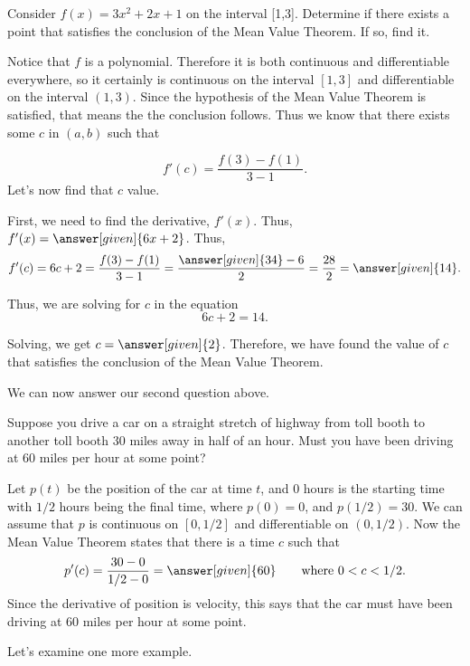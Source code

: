 \documentclass{ximera}
\begin{document}
\begin{example}
    Consider $f(x)=3x^2+2x+1$ on the interval [1,3]. Determine if there exists a point that satisfies the conclusion of the Mean Value Theorem. If so, find it.
    \begin{explanation}
        Notice that $f$ is a polynomial. Therefore it is both continuous and differentiable everywhere, so it certainly is continuous on the interval $[1,3]$ and differentiable on the interval $(1,3)$. Since the hypothesis of the Mean Value Theorem is satisfied, that means the the conclusion follows. Thus we know that there exists some $c$ in $(a,b)$ such that
        
        \[ f'(c)=\frac{f(3)-f(1)}{3-1}.\]
        Let's now find that $c$ value.

    First, we need to find the derivative, $f'(x)$. Thus, $f'(x)=\answer[given]{6x+2}$. Thus,
    \[ f'(c)=6c+2=\frac{f(3)-f(1)}{3-1}=\frac{\answer[given]{34}-6}{2}=\frac{28}{2}=\answer[given]{14}.\]

    Thus, we are solving for $c$ in the equation
    \[6c+2=14.\]

    Solving, we get $c=\answer[given]{2}$. Therefore, we have found the value of $c$ that satisfies the conclusion of the Mean Value Theorem.
    \end{explanation}
\end{example}
We can now answer our second question above.  

\begin{example}
Suppose you drive a car on a straight stretch of highway from toll booth to another toll
booth $30$ miles away in half of an hour. Must you have been driving
at $60$ miles per hour at some point?

\begin{explanation}
Let $p(t)$ be the position of the car at time $t$, and $0$ hours is the
starting time with $1/2$ hours being the final time, where $p(0)=0$, and $p(1/2)=30$.
We can assume that $p$ is continuous on $[0,1/2]$ and differentiable on
$(0,1/2)$. Now the Mean Value Theorem states that there is a time $c$ such that
\[
p'(c) = \frac{30-0}{1/2-0} = \answer[given]{60}\qquad \text{where $0<c<1/2$.}
\]
Since the derivative of position is velocity, this says that the car
must have been driving at $60$ miles per hour at some point.
\end{explanation}
\end{example}
Let's examine one more example.
\end{document}

